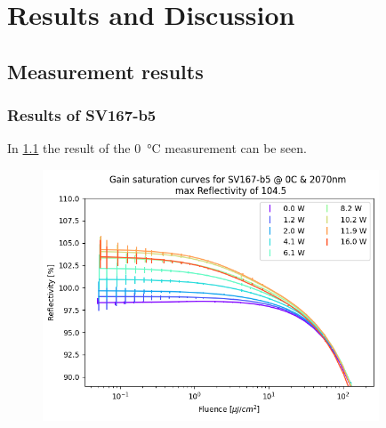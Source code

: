 \chapter{Results and Discussion}\label{chapter:results}

\section{Measurement results}
\subsection{Results of SV167-b5}
In \cref{fig:gainSV167} the result of the \qty{0}{\celsius} measurement can be seen. 

\begin{figure}
    \centering
    \includegraphics[width=10cm]{images/sv167-b5_0C.png}
    \caption{}
    \label{fig:gainSV167}
\end{figure}

